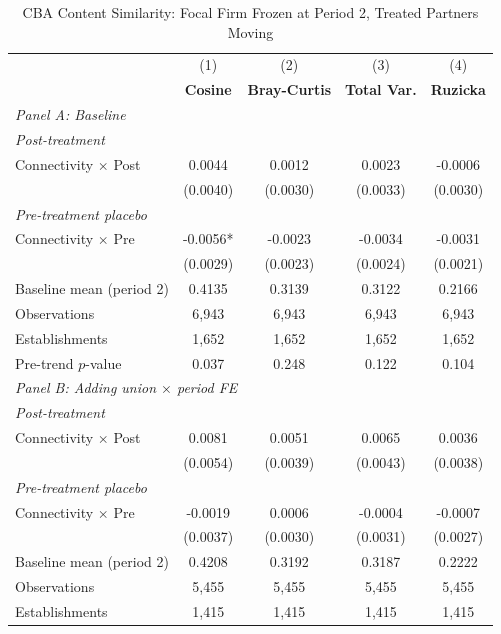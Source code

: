 \begin{table}[H]
\centering
\caption{CBA Content Similarity: Focal Firm Frozen at Period 2, Treated Partners Moving}
\label{tab:focal_frozen_cba_similarity}
\scriptsize
\setlength{\tabcolsep}{8pt}
\begin{tabular}{lcccc}
\hline\hline
 & (1) & (2) & (3) & (4) \\
 & \textbf{Cosine} & \textbf{Bray-Curtis} & \textbf{Total Var.} & \textbf{Ruzicka} \\
\hline
\multicolumn{5}{l}{\textit{Panel A: Baseline}} \\
\multicolumn{5}{l}{\textit{Post-treatment}} \\
Connectivity $\times$ Post & 0.0044 & 0.0012 & 0.0023 & -0.0006 \\
 & (0.0040) & (0.0030) & (0.0033) & (0.0030) \\
\multicolumn{5}{l}{\textit{Pre-treatment placebo}} \\
Connectivity $\times$ Pre & -0.0056* & -0.0023 & -0.0034 & -0.0031 \\
 & (0.0029) & (0.0023) & (0.0024) & (0.0021) \\
\hline
Baseline mean (period 2) & 0.4135 & 0.3139 & 0.3122 & 0.2166 \\
Observations &        6,943 &        6,943 &        6,943 &        6,943 \\
Establishments &        1,652 &        1,652 &        1,652 &        1,652 \\
Pre-trend $p$-value & 0.037 & 0.248 & 0.122 & 0.104 \\
\hline
\multicolumn{5}{l}{\textit{Panel B: Adding union $\times$ period FE}} \\
\multicolumn{5}{l}{\textit{Post-treatment}} \\
Connectivity $\times$ Post & 0.0081 & 0.0051 & 0.0065 & 0.0036 \\
 & (0.0054) & (0.0039) & (0.0043) & (0.0038) \\
\multicolumn{5}{l}{\textit{Pre-treatment placebo}} \\
Connectivity $\times$ Pre & -0.0019 & 0.0006 & -0.0004 & -0.0007 \\
 & (0.0037) & (0.0030) & (0.0031) & (0.0027) \\
\hline
Baseline mean (period 2) & 0.4208 & 0.3192 & 0.3187 & 0.2222 \\
Observations &        5,455 &        5,455 &        5,455 &        5,455 \\
Establishments &        1,415 &        1,415 &        1,415 &        1,415 \\

\end{tabular}
\end{table}
